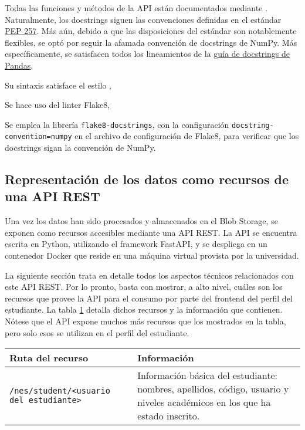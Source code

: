
Todas las funciones y métodos de la \gls{API} están documentados mediante . Naturalmente, los docstrings siguen las convenciones definidas en el estándar \href{https://peps.python.org/pep-0257/}{\gls{PEP} 257}. Más aún, debido a que las disposiciones del estándar son notablemente flexibles, se optó por seguir la afamada convención de docstrings de \gls{NumPy}. Más específicamente, se satisfacen todos los lineamientos de la \href{https://python-sprints.github.io/pandas/guide/pandas_docstring.html}{guía de docstrings de \gls{Pandas}}.

Su sintaxis satisface el estilo ,

Se hace uso del linter \gls{Flake8},

Se emplea la librería \verb|flake8-docstrings|, con la configuración \verb|docstring-convention=numpy| en el archivo de configuración de Flake8, para verificar que los docstrings sigan la convención de NumPy.



\subsection{Representación de los datos como recursos de una API REST}

Una vez los datos han sido procesados y almacenados en el Blob Storage, se exponen como recursos accesibles mediante una \gls{API REST}. La \gls{API} se encuentra escrita en Python, utilizando el framework FastAPI, y se despliega en un contenedor Docker que reside en una máquina virtual provista por la universidad.

La siguiente sección trata en detalle todos los aspectos técnicos relacionados con este \gls{API REST}. Por lo pronto, basta con mostrar, a alto nivel, cuáles son los recursos que provee la \gls{API} para el consumo por parte del frontend del perfil del estudiante. La tabla \ref{tab:recursos} detalla dichos recursos y la información que contienen. Nótese que el \gls{API} expone muchos más recursos que los mostrados en la tabla, pero solo esos se utilizan en el perfil del estudiante.

\begin{table}[h]
	\centering
	\caption{Recursos de la \gls{API REST}}
	\alternatecolors
	\begin{longtable}{p{3cm}p{8cm}}
		\hline
		\textbf{Ruta del recurso}                     & \textbf{Información}                                                                                                       \\
		\hline
		\verb*|/nes/student/<usuario del estudiante>| & Información básica del estudiante: nombres, apellidos, código, usuario y niveles académicos en los que ha estado inscrito. \\
		\hline
	\end{longtable}
	\label{tab:recursos}
\end{table}